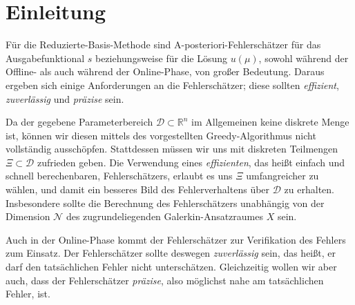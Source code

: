 
\section{Einleitung} %
\label{sec:einleitung}

Für die Reduzierte-Basis-Methode sind A-posteriori-Fehlerschätzer für das Ausgabefunktional $s$ beziehungsweise für die Lösung $u(\mu)$, sowohl während der Offline- als auch während der Online-Phase, von großer Bedeutung.
Daraus ergeben sich einige Anforderungen an die Fehlerschätzer; diese sollten \emph{effizient}, \emph{zuverlässig} und \emph{präzise} sein.

Da der gegebene Parameterbereich $\mathcal D \subset \mathbb{R}^n$ im Allgemeinen keine diskrete Menge ist, können wir diesen mittels des vorgestellten Greedy-Algorithmus nicht vollständig ausschöpfen.
Stattdessen müssen wir uns mit diskreten Teilmengen $\Xi \subset \mathcal D$ zufrieden geben.
Die Verwendung eines \emph{effizienten}, das heißt einfach und schnell berechenbaren, Fehlerschätzers, erlaubt es uns $\Xi$ umfangreicher zu wählen, und damit ein besseres Bild des Fehlerverhaltens über $\mathcal D$ zu erhalten.
Insbesondere sollte die Berechnung des Fehlerschätzers unabhängig von der Dimension $\mathcal N$ des zugrundeliegenden Galerkin-Ansatzraumes $X$ sein.

Auch in der Online-Phase kommt der Fehlerschätzer zur Verifikation des Fehlers zum Einsatz.
Der Fehlerschätzer sollte deswegen \emph{zuverlässig} sein, das heißt, er darf den tatsächlichen Fehler nicht unterschätzen.
Gleichzeitig wollen wir aber auch, dass der Fehlerschätzer \emph{präzise}, also möglichst nahe am tatsächlichen Fehler, ist.

